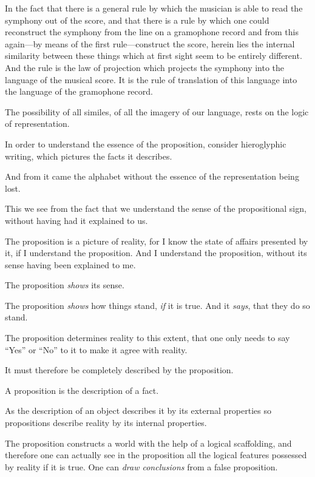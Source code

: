 {In the fact that there is a general rule by which
the musician is able to read the symphony out of
the score, and that there is a rule by which one
could reconstruct the symphony from the line on
a gramophone record and from this again---by
means of the first rule---construct the score, herein
lies the internal similarity between these things
which at first sight seem to be entirely different.
And the rule is the law of projection which projects
the symphony into the language of the musical
score. It is the rule of translation of this language
into the language of the gramophone record.}


{The possibility of all similes, of all the
imagery of our language, rests on the logic of
representation.}


{In order to understand the essence of the
proposition, consider hieroglyphic writing, which
pictures the facts it describes.

And from it came the alphabet without the
essence of the representation being lost.}


{This we see from the fact that we understand
the sense of the propositional sign, without having
had it explained to us.}


{The proposition is a picture of reality, for I know
the state of affairs presented by it, if I understand
the proposition. And I understand the proposition,
without its sense having been explained to me.}


{The proposition \emph{shows} its sense.

The proposition \emph{shows} how things stand, \emph{if} it is
true. And it \emph{says}, that they do so stand.}


{The proposition determines reality to this
extent, that one only needs to say ``Yes'' or
``No'' to it to make it agree with reality.

It must therefore be completely described by
the proposition.

A proposition is the description of a fact.

As the description of an object describes it by
its external properties so propositions describe
reality by its internal properties.

The proposition constructs a world with the
help of a logical scaffolding, and therefore one
can actually see in the proposition all the logical
features possessed by reality if it is true. One can
\emph{draw conclusions} from a false proposition.}


